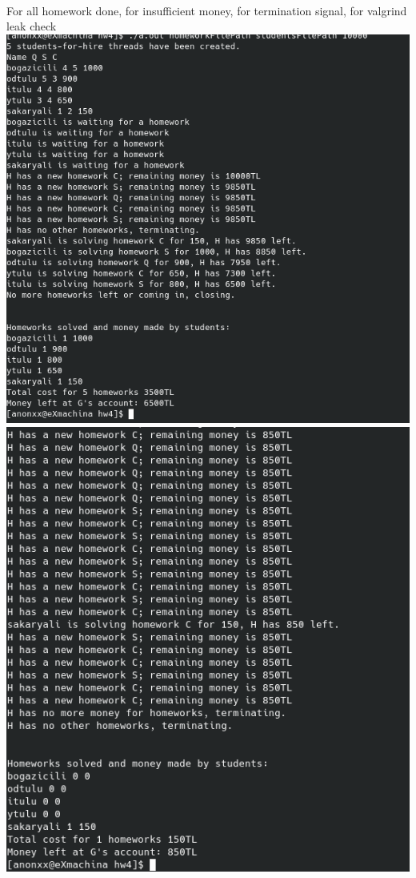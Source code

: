 \documentclass{report}
\begin{document}
{\large  \\ For all homework done, for insufficient money, for termination signal, for valgrind leak check }
\newline
\includegraphics[width=\textwidth,height=\textheight,keepaspectratio]{images/done.png} \\
\includegraphics[width=\textwidth,height=\textheight,keepaspectratio]{images/nomoney.png}\\
\end{document}
